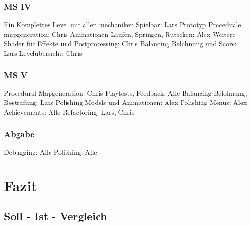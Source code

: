 \documentclass[12pt]{article}
\begin{document}
\vspace{1cm}
\subsubsection{MS IV}

Ein Komplettes Level mit allen mechaniken Spielbar: Lars\newline
Prototyp Proceduale mapgeneration: Chris\newline
Animationen Laufen, Springen, Rutschen: Alex\newline
Weitere Shader für Effekte und Postprocessing: Chris\newline
Balancing Belohnung und Score: Lars\newline
Levelübersicht: Chris\newline

\vspace{1cm}
\subsubsection{MS V}

Procedural Mapgeneration: Chris\newline
Playtests, Feedback: Alle\newline
Balancing Belohnung, Bestrafung: Lars\newline
Polishing Models und Animationen: Alex\newline
Polishing Menüs: Alex\newline
Achievements: Alle\newline
Refactoring: Lars, Chris\newline

\vspace{1cm}
\subsubsection{Abgabe}

Debugging: Alle\newline
Polishing: Alle\newline

\newpage
\section{Fazit}

\vspace{2cm}
\subsection{Soll - Ist - Vergleich}
\end{document}
